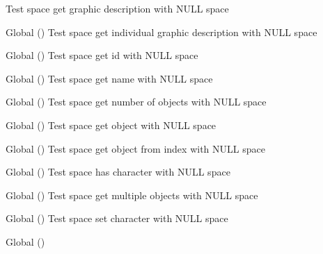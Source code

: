 \begin{DoxyRefList}
%
Test space get graphic description with NULL space  
\item[Global \doxylink{space__test_8c_a4f9ada1e7b9847c4c2ecab52f92c7f72}{test2\+\_\+space\+\_\+get\+\_\+i\+\_\+description} ()]\label{test__test000189}%
%
Test space get individual graphic description with NULL space  
\item[Global \doxylink{space__test_8c_af9087176b0d3c41d83a17a4918b13e31}{test2\+\_\+space\+\_\+get\+\_\+id} ()]\label{test__test000162}%
%
Test space get id with NULL space  
\item[Global \doxylink{space__test_8c_aee88ed31c63efc674051a4563aed86e2}{test2\+\_\+space\+\_\+get\+\_\+name} ()]\label{test__test000164}%
%
Test space get name with NULL space  
\item[Global \doxylink{space__test_8c_a0b036973034eb7e3ff71ad43dcdea0a3}{test2\+\_\+space\+\_\+get\+\_\+num\+\_\+objects} ()]\label{test__test000181}%
%
Test space get number of objects with NULL space  
\item[Global \doxylink{space__test_8h_a0fe857c34f691aaba197d03315c3955f}{test2\+\_\+space\+\_\+get\+\_\+object} ()]\label{test__test000166}%
%
Test space get object with NULL space  
\item[Global \doxylink{space__test_8c_a68376dad775343380755a49fc53bc8ad}{test2\+\_\+space\+\_\+get\+\_\+object\+\_\+from\+\_\+index} ()]\label{test__test000179}%
%
Test space get object from index with NULL space  
\item[Global \doxylink{space__test_8c_a1cbe7dcf6e64da12172acc79abbd3f65}{test2\+\_\+space\+\_\+has\+\_\+character} ()]\label{test__test000187}%
%
Test space has character with NULL space  
\item[Global \doxylink{space__test_8c_a4c5deb606df6b7b0bd886069628a35e4}{test2\+\_\+space\+\_\+multiple\+\_\+objects} ()]\label{test__test000168}%
%
Test space get multiple objects with NULL space  
\item[Global \doxylink{space__test_8c_a8e7d3726a7551c0de5825cc882836a71}{test2\+\_\+space\+\_\+set\+\_\+character} ()]\label{test__test000185}%
%
Test space set character with NULL space  
\item[Global \doxylink{space__test_8c_a997b53a481b02485dd54c9cbce83465a}{test2\+\_\+space\+\_\+set\+\_\+discovered} ()]\label{test__test000173}%

\end{DoxyRefList}
